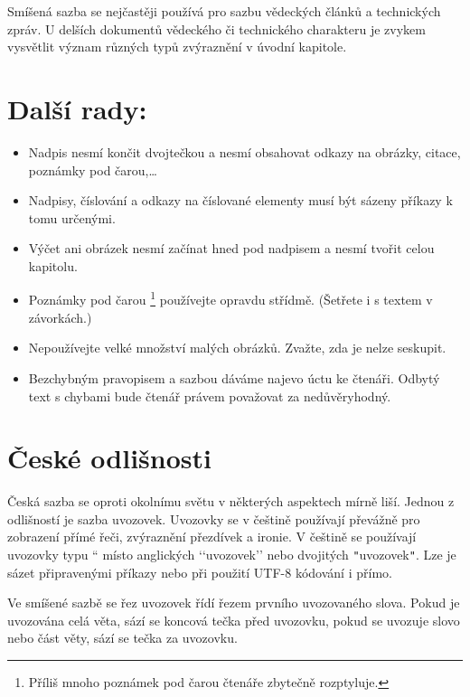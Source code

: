 \documentclass[a4paper,10pt,twocolumn]{article}
\newcommand{\uvozovky}[1]{\quotedblbase #1\textquotedblleft}
\begin{document}
Smíšená sazba se nejčastěji používá pro sazbu vědeckých článků a technických zpráv. U delších dokumentů vědeckého či technického charakteru je zvykem vysvětlit význam různých typů zvýraznění v úvodní kapitole.

\section{Další rady:}
\begin{itemize}
\item Nadpis nesmí končit dvojtečkou a nesmí obsahovat odkazy na obrázky, citace, poznámky pod čarou,\dots

\item Nadpisy, číslování a odkazy na číslované elementy musí být sázeny příkazy k tomu určenými.

\item Výčet ani obrázek nesmí začínat hned pod nadpisem a nesmí tvořit celou kapitolu.

\item Poznámky pod čarou \footnote{Příliš mnoho poznámek pod čarou čtenáře zbytečně rozptyluje.} používejte opravdu střídmě. (Šetřete i s textem v závorkách.)

\item Nepoužívejte velké množství malých obrázků. Zvažte, zda je nelze seskupit.

\item Bezchybným pravopisem a sazbou dáváme najevo úctu ke čtenáři. Odbytý text s chybami bude čtenář právem považovat za nedůvěryhodný.
\end{itemize}

\section{České odlišnosti}

Česká sazba se oproti okolnímu světu v některých aspektech mírně liší. Jednou z odlišností je sazba uvozovek. Uvozovky se v češtině používají převážně pro zobrazení přímé řeči, zvýraznění přezdívek a ironie. V češtině se používají uvozovky typu \uvozovky{9966} místo anglických ‘‘uvozovek’’ nebo dvojitých \texttt{"}uvozovek\texttt{"}. Lze je sázet připravenými příkazy nebo při použití UTF-8 kódování i přímo.

Ve smíšené sazbě se řez uvozovek řídí řezem prvního uvozovaného slova. Pokud je uvozována celá věta, sází se koncová tečka před uvozovku, pokud se uvozuje slovo nebo část věty, sází se tečka za uvozovku.
\end{document}
